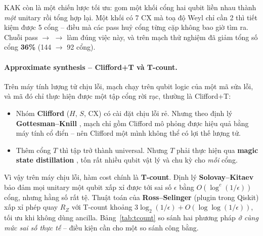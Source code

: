KAK còn là một chiến lược tối ưu: gom một khối cổng hai qubit liền nhau thành \emph{một} unitary rồi
tổng hợp lại. Một khối có 7 CX mà toạ độ Weyl chỉ cần 2 thì tiết kiệm được 5 cổng -- điều mà các pass
huỷ cổng từng cặp không bao giờ tìm ra. Chuỗi pass  $\to$
 $\to$  làm đúng việc này, và trên mạch thử nghiệm đã
giảm tổng số cổng \textbf{36\%} (144 $\to$ 92 cổng).

\paragraph{Approximate synthesis -- Clifford+T và T-count.} Trên máy tính lượng tử chịu lỗi, mạch
chạy trên qubit logic của một mã sửa lỗi, và mã đó chỉ thực hiện được một tập cổng rời rạc, thường là
Clifford+T:
\begin{itemize}[noitemsep]
  \item Nhóm \textbf{Clifford} ($H$, $S$, CX) có cài đặt chịu lỗi rẻ. Nhưng theo định lý
    \textbf{Gottesman--Knill} \cite{gottesman1998}, mạch chỉ gồm Clifford mô phỏng được hiệu quả bằng
    máy tính cổ điển -- nên Clifford một mình không thể có lợi thế lượng tử.
  \item Thêm cổng $T$ thì tập trở thành universal. Nhưng $T$ phải thực hiện qua \textbf{magic state
    distillation} \cite{bravyi2005magic}, tốn rất nhiều qubit vật lý và chu kỳ cho \emph{mỗi} cổng.
\end{itemize}
Vì vậy trên máy chịu lỗi, hàm cost chính là \textbf{T-count}. Định lý \textbf{Solovay--Kitaev}
\cite{dawson2006sk} bảo đảm mọi unitary một qubit xấp xỉ được tới sai số $\epsilon$ bằng
$O(\log^c(1/\epsilon))$ cổng, nhưng hằng số rất tệ. Thuật toán của \textbf{Ross--Selinger}
\cite{ross2016gridsynth} (plugin  trong Qiskit) xấp xỉ phép quay $R_Z$ với T-count
khoảng $3\log_2(1/\epsilon) + O(\log\log(1/\epsilon))$, tối ưu khi không dùng ancilla. Bảng~\ref{tab:tcount}
so sánh hai phương pháp \emph{ở cùng mức sai số thực tế} -- điều kiện cần cho một so sánh công bằng.

